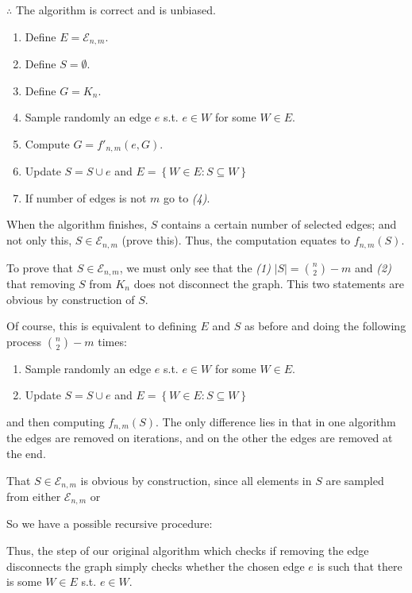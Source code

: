 \documentclass[a4paper, 12pt]{article}
\begin{document}
$\therefore $ The algorithm is correct and is unbiased.



\pagebreak
\begin{enumerate}
    \item Define $E = \mathcal{E}_{n, m}$.
    \item Define $S = \emptyset$.
    \item Define $G = K_n$.
    \item Sample randomly an edge $e$ s.t. $e \in W$ for some $W \in E$. 
    \item Compute $G = f'_{n,m}(e, G)$. 
    \item Update $S = S \cup e $ and $E = \left\{ W \in E : S \subseteq W \right\} $
    \item If number of edges is not $m$ go to \textit{(4)}.
\end{enumerate}

When the algorithm finishes, $S$ contains a certain number of selected edges;
and not only this, $S \in \mathcal{E}_{n,m}$ (prove this). Thus, the
computation equates to $f_{n,m}(S)$.

To prove that $S \in \mathcal{E}_{n,m}$, we must only see that the \textit{(1)}
$|S| = \binom{n}{2} - m$ and \textit{(2)} that removing $S$ from $K_n$ does not
disconnect the graph. This two statements are obvious by construction of $S$.


\pagebreak

Of course, this is equivalent to defining $E$ and $S$ as before and doing the following process $\binom{n}{2} - m$ times:

\begin{enumerate}
    \item Sample randomly an edge $e$ s.t. $e \in W$ for some $W \in E$. 
    \item Update $S = S \cup e $ and $E = \left\{ W \in E : S \subseteq W \right\} $
\end{enumerate}

and then computing $f_{n,m}(S)$. The only difference lies in that in one
algorithm the edges are removed on iterations, and on the other the edges are
removed at the end. 

That $S \in \mathcal{E}_{n, m}$ is obvious by construction, 
since all elements in $S$ are sampled from either $\mathcal{E}_{n,m}$
or 

So we have a possible recursive procedure:

Thus, the step of our original algorithm which checks if removing the edge
disconnects the graph simply checks whether the chosen edge $e$ is such that
there is some $W \in E$ s.t. $e \in W$.
\end{document}
